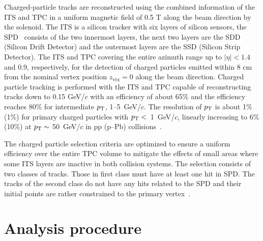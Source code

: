 Charged-particle tracks are reconstructed using the combined information of the ITS and TPC in a uniform magnetic field of 0.5 T along the beam direction by the solenoid. The ITS is a silicon tracker with six layers of silicon sensors, the SPD~\cite{Santoro2009:ALICESPD} consists of the two innermost layers, the next two layers are the SDD (Silicon Drift Detector) and the outermost layers are the SSD (Silicon Strip Detector). The ITS and TPC covering the entire azimuth range up to $|\eta|<1.4$ and 0.9, respectively, for the detection of charged particles emitted within 8 cm from the nominal vertex position $z_\mathrm{vtx}=0$ along the beam direction. Charged particle tracking is performed with the ITS and TPC capable of reconstructing tracks down to 0.15 GeV/$c$ with an efficiency of about 65\% and the efficiency reaches 80\% for intermediate $p_\mathrm{T}$, 1--5~GeV/$c$. The resolution of $p_\mathrm{T}$ is about 1\% (1\%) for primary charged particles with $p_\mathrm{T}<$~1~GeV/$c$, linearly increasing to 6\% (10\%) at $p_\mathrm{T}\sim$ 50~GeV/$c$ in pp (p--Pb) collisions~\cite{ALICE:2018vuu}. 

The charged particle selection criteria are optimized to ensure a uniform efficiency over the entire TPC volume to mitigate the effects of small areas where some ITS layers are inactive in both collision systems. The selection consists of two classes of tracks. Those in first class must have at least one hit in SPD. The tracks of the second class do not have any hits related to the SPD and their initial points are rather constrained to the primary vertex~\cite{hybridExplanation}. 

\section{Analysis procedure}
\label{sec:ana}
